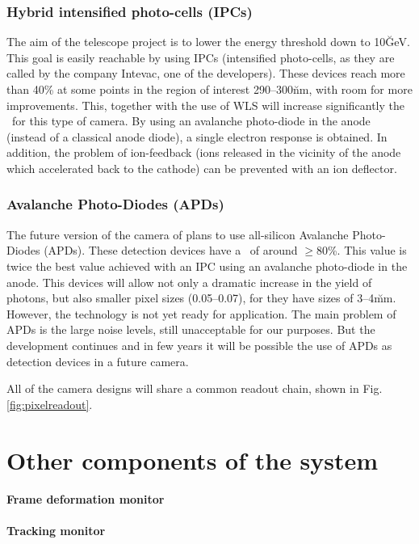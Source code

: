 \subsubsection{Hybrid intensified photo-cells (IPCs)}
%
The aim of the telescope project is to lower the energy threshold down
to 10\u{GeV}. This goal is easily reachable by using IPCs (intensified
photo-cells, as they are called by the company Intevac, one of the
developers). These devices reach more than 40\% \QE at some points in
the region of interest 290--300\u{nm}, with room for more
improvements. This, together with the use of WLS will increase
significantly the \QEeff\ for this type of camera. By using an
avalanche photo-diode in the anode (instead of a classical anode
diode), a single electron response is obtained. In addition, the
problem of ion-feedback (ions released in the vicinity of the anode
which accelerated back to the cathode) can be prevented with an ion
deflector.

\subsubsection{Avalanche Photo-Diodes (APDs)}
%
The future version of the camera of \MAGIC plans to use all-silicon
Avalanche Photo-Diodes (APDs). These detection devices have a \QEeff\ 
of around $\geq$80\%. This value is twice the best value achieved with
an IPC using an avalanche photo-diode in the anode. This devices will
allow not only a dramatic increase in the yield of \Cherenkov photons,
but also smaller pixel sizes (0.05\deg--0.07\deg), for they have sizes
of 3--4\u{mm}. However, the technology is not yet ready for
application. The main problem of APDs is the large noise levels, still
unacceptable for our purposes. But the development continues and in
few years it will be possible the use of APDs as detection devices in
a future \MAGIC camera.

All of the camera designs will share a common readout chain, shown in
Fig.\ref{fig:pixelreadout}. 

\section{Other components of the system}

\paragraph{Frame deformation monitor}

\paragraph{Tracking monitor}

